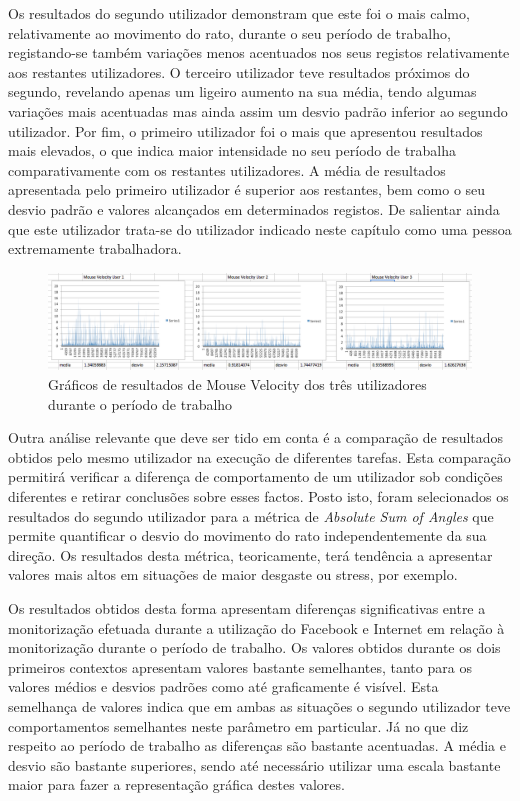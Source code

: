 Os resultados do segundo utilizador demonstram que este foi o mais calmo, relativamente ao movimento do rato, durante o seu período de trabalho, registando-se também variações menos acentuados nos seus registos relativamente aos restantes utilizadores. O terceiro utilizador teve resultados próximos do segundo, revelando apenas um ligeiro aumento na sua média, tendo algumas variações mais acentuadas mas ainda assim um desvio padrão inferior ao segundo utilizador. Por fim, o primeiro utilizador foi o mais que apresentou resultados mais elevados, o que indica maior intensidade no seu período de trabalha comparativamente com os restantes utilizadores. A média de resultados apresentada pelo primeiro utilizador é superior aos restantes, bem como o seu desvio padrão e valores alcançados em determinados registos. De salientar ainda que este utilizador trata-se do utilizador indicado neste capítulo como uma pessoa extremamente trabalhadora.

 \begin{figure}[htb]
   \centering
   \includegraphics[scale=0.3]{Images/mousevelocity.png}
   \caption{Gráficos de resultados de Mouse Velocity dos três utilizadores durante o período de trabalho}
\end{figure}

Outra análise relevante que deve ser tido em conta é a comparação de resultados obtidos pelo mesmo utilizador na execução de diferentes tarefas. Esta comparação permitirá verificar a diferença de comportamento de um utilizador sob condições diferentes e retirar conclusões sobre esses factos. Posto isto, foram selecionados os resultados do segundo utilizador para a métrica de \textit{Absolute Sum of Angles} que permite quantificar o desvio do movimento do rato independentemente da sua direção. Os resultados desta métrica, teoricamente, terá tendência a apresentar valores mais altos em situações de maior desgaste ou stress, por exemplo.

Os resultados obtidos desta forma apresentam diferenças significativas entre a monitorização efetuada durante a utilização do Facebook e Internet em relação à monitorização durante o período de trabalho. Os valores obtidos durante os dois primeiros contextos apresentam valores bastante semelhantes, tanto para os valores médios e desvios padrões como até graficamente é visível. Esta semelhança de valores indica que em ambas as situações o segundo utilizador teve comportamentos semelhantes neste parâmetro em particular. Já no que diz respeito ao período de trabalho as diferenças são bastante acentuadas. A média e desvio são bastante superiores, sendo até necessário utilizar uma escala bastante maior para fazer a representação gráfica destes valores. 

